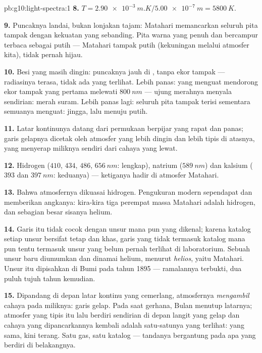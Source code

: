 \begin{solution}{pb:g10:light-spectra:1}
\textbf{8.} $T = \qty{2.90e-3}{m.K} / \qty{5.00e-7}{m} = \qty{5800}{K}$.

\textbf{9.} Puncaknya landai, bukan lonjakan tajam: Matahari memancarkan
seluruh pita tampak dengan kekuatan yang sebanding. Pita warna yang
penuh dan bercampur terbaca sebagai putih --- Matahari tampak putih
(kekuningan melalui atmosfer kita), tidak pernah hijau.

\textbf{10.} Besi yang masih dingin: puncaknya jauh di ,
tanpa ekor tampak --- radiasinya terasa, tidak ada yang terlihat. Lebih
panas:  yang menguat mendorong ekor tampak yang pertama
melewati $\qty{800}{nm}$ --- ujung merahnya menyala sendirian: merah
suram. Lebih panas lagi: seluruh pita tampak terisi sementara semuanya
menguat: jingga, lalu menuju putih.

\textbf{11.} Latar kontinunya datang dari permukaan berpijar yang rapat
dan panas; garis gelapnya dicetak oleh atmosfer yang lebih dingin dan
lebih tipis di atasnya, yang menyerap  miliknya
sendiri dari cahaya yang lewat.

\textbf{12.} Hidrogen ($410$, $434$, $486$, $\qty{656}{nm}$: lengkap),
natrium ($\qty{589}{nm}$) dan kalsium ($393$ dan $\qty{397}{nm}$:
keduanya) --- ketiganya hadir di atmosfer Matahari.

\textbf{13.} Bahwa atmosfernya dikuasai hidrogen. Pengukuran modern
sependapat dan memberikan angkanya: kira-kira tiga perempat massa
Matahari adalah hidrogen, dan sebagian besar sisanya helium.

\textbf{14.} Garis itu tidak cocok dengan unsur mana pun yang dikenal;
karena katalog setiap unsur bersifat tetap dan khas, garis yang tidak
termasuk katalog mana pun tentu termasuk unsur yang belum pernah
terlihat di laboratorium. Sebuah unsur baru diumumkan dan dinamai
helium, menurut \emph{helios}, yaitu Matahari. Unsur itu dipisahkan di
Bumi pada tahun 1895 --- ramalannya terbukti, dua puluh tujuh tahun
kemudian.

\textbf{15.} Dipandang di depan latar kontinu yang cemerlang,
atmosfernya \emph{mengambil} cahaya pada  miliknya:
garis gelap. Pada saat gerhana, Bulan menutup latarnya; atmosfer yang
tipis itu lalu berdiri sendirian di depan langit yang gelap dan cahaya
yang dipancarkannya kembali adalah satu-satunya yang terlihat:  yang sama, kini terang. Satu gas, satu katalog --- tandanya
bergantung pada apa yang berdiri di belakangnya.


\end{solution}
